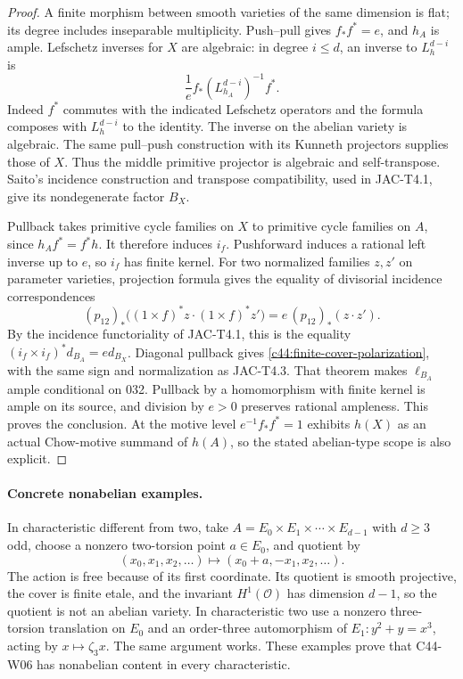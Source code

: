 \begin{proof}
A finite morphism between smooth varieties of the same dimension is
flat; its degree includes inseparable multiplicity. Push--pull gives
$f_*f^*=e$, and $h_A$ is ample. Lefschetz inverses for $X$ are
algebraic: in degree $i\leq d$, an inverse to $L_h^{d-i}$ is
\[
 \frac1e f_* (L_{h_A}^{d-i})^{-1}f^*.
\]
Indeed $f^*$ commutes with the indicated Lefschetz operators and
the formula composes with $L_h^{d-i}$ to the identity. The inverse
on the abelian variety is algebraic. The same pull--push construction
with its Kunneth projectors supplies those of $X$. Thus the middle
primitive projector is algebraic and self-transpose. Saito's
incidence construction and transpose compatibility, used in
JAC-T4.1, give its nondegenerate factor $B_X$.

Pullback takes primitive cycle families on $X$ to primitive cycle
families on $A$, since $h_Af^*=f^*h$. It therefore induces $i_f$.
Pushforward induces a rational left inverse up to $e$, so $i_f$ has
finite kernel. For two normalized families $z,z'$ on parameter
varieties, projection formula gives the equality of divisorial
incidence correspondences
\[
 (p_{12})_*\bigl((1\times f)^*z\cdot(1\times f)^*z'\bigr)
   =e\,(p_{12})_*(z\cdot z').
\]
By the incidence functoriality of JAC-T4.1, this is the equality
$(i_f\times i_f)^*d_{B_A}=e d_{B_X}$. Diagonal pullback gives
\eqref{c44:finite-cover-polarization}, with the same sign and
normalization as JAC-T4.3. That theorem makes $\ell_{B_A}$ ample
conditional on 032. Pullback by a homomorphism with finite kernel
is ample on its source, and division by $e>0$ preserves rational
ampleness. This proves the conclusion. At the motive level
$e^{-1}f_*f^*=1$ exhibits $h(X)$ as an actual Chow-motive summand
of $h(A)$, so the stated abelian-type scope is also explicit.
\end{proof}

\paragraph{Concrete nonabelian examples.}
In characteristic different from two, take
$A=E_0\times E_1\times\cdots\times E_{d-1}$ with $d\geq3$ odd,
choose a nonzero two-torsion point $a\in E_0$, and quotient by
\[
 (x_0,x_1,x_2,\ldots)\longmapsto(x_0+a,-x_1,x_2,\ldots).
\]
The action is free because of its first coordinate. Its quotient
is smooth projective, the cover is finite etale, and the invariant
$H^1(\mathcal O)$ has dimension $d-1$, so the quotient is not an
abelian variety. In characteristic two use a nonzero three-torsion
translation on $E_0$ and an order-three automorphism of
$E_1:y^2+y=x^3$, acting by $x\mapsto\zeta_3x$. The same argument
works. These examples prove that C44-W06 has nonabelian content in
every characteristic.

